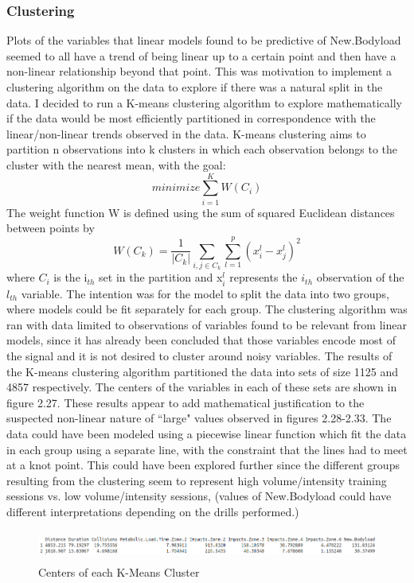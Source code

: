 \subsubsection{Clustering}
Plots of the variables that linear models found to be predictive of New.Bodyload seemed to all have a trend of being linear up to a certain point and then have a non-linear relationship beyond that point. This was motivation to implement a clustering algorithm on the data to explore if there was a natural split in the data. I decided to run a K-means clustering algorithm to explore mathematically if the data would be most efficiently partitioned in correspondence with the linear/non-linear trends observed in the data.  K-means clustering aims to partition n observations into k clusters in which each observation belongs to the cluster with the nearest mean, with the goal:
\[minimize \sum_{i=1}^{K}W(C_i)\]
The weight function W is defined using the sum of squared Euclidean distances between points by \[W(C_k)=\frac{1}{|C_k|}\sum_{i,j \in{C_k}}\sum_{l=1}^{p} (x_i^l-x_j^l)^2\]
where $C_i$ is the i$_{th}$ set in the partition and x$_i^l$ represents the $i_{th}$ observation of the $l_{th}$ variable. The intention was for the model to split the data into two groups, where models could be fit separately for each group. The clustering algorithm was ran with data limited to observations of variables found to be relevant from linear models, since it has already been concluded that those variables encode most of the signal and it is not desired to cluster around noisy variables. The results of the K-means clustering algorithm partitioned the data into sets of size 1125 and 4857 respectively. The centers of the variables in each of these sets are shown in figure 2.27. These results appear to add mathematical justification to the suspected non-linear nature of ``large" values observed in figures 2.28-2.33. The data could have been modeled using a piecewise linear function which fit the data in each group using a separate line, with the constraint that the lines had to meet at a knot point. This could have been explored further since the different groups resulting from the clustering seem to represent high volume/intensity training sessions vs. low volume/intensity sessions, (values of New.Bodyload could have different interpretations depending on the drills performed.)
\begin{figure}[h]
	\centering
	\includegraphics[width=16.8cm, height=1cm]{Images/ClusteringCenters.png}
	\caption{Centers of each K-Means Cluster}
\end{figure} 

